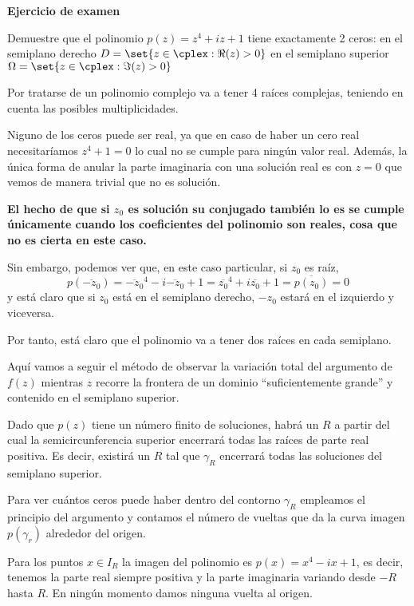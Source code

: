 \begin{problem} {\bf Ejercicio de examen}

Demuestre que el polinomio $p(z) = z^4 + iz + 1$ tiene exactamente 2 ceros:
\ppart en el semiplano derecho $D = \set{z \in \cplex : \Re(z) > 0}$
\ppart en el semiplano superior $\Omega = \set{z \in \cplex : \Im(z) > 0}$
\solution


Por tratarse de un polinomio complejo va a tener 4 raíces complejas, teniendo en cuenta las posibles multiplicidades.

Niguno de los ceros puede ser real, ya que en caso de haber un cero real necesitaríamos $z^4+1=0$ lo cual no se cumple para ningún valor real. Además, la única forma de anular la parte imaginaria con una solución real es con $z=0$ que vemos de manera trivial que no es solución.

\spart

\textbf{El hecho de que si $z_0$ es solución su conjugado también lo es se cumple únicamente cuando los coeficientes del polinomio son reales, cosa que no es cierta en este caso.}

Sin embargo, podemos ver que, en este caso particular, si $z_0$ es raíz,
\[p(\overline{-z_0})=\overline{-z_0}^4-i\overline{-z_0}+1=\overline{z_0}^4+i\overline{z_0}+1=\overline{p(z_0)}=0\]
y está claro que si $z_0$ está en el semiplano derecho, $-z_0$ estará en el izquierdo y viceversa.

Por tanto, está claro que el polinomio va a tener dos raíces en cada semiplano.

\spart

Aquí vamos a seguir el método de observar la variación total del argumento de $f(z)$ mientras $z$ recorre la frontera de un dominio ``suficientemente grande'' y contenido en el semiplano superior.

Dado que $p(z)$ tiene un número finito de soluciones, habrá un $R$ a partir del cual la semicircunferencia superior encerrará todas las raíces de parte real positiva. Es decir, existirá un $R$ tal que $γ_R$ encerrará todas las soluciones del semiplano superior.

Para ver cuántos ceros puede haber dentro del contorno $γ_R$ empleamos el principio del argumento y contamos el número de vueltas que da la curva imagen $p(γ_r)$ alrededor del origen.

Para los puntos $x \in I_R$ la imagen del polinomio es $p(x)=x^4-ix+1$, es decir, tenemos la parte real siempre positiva y la parte imaginaria variando desde $-R$ hasta $R$. En ningún momento damos ninguna vuelta al origen.


\end{problem}
